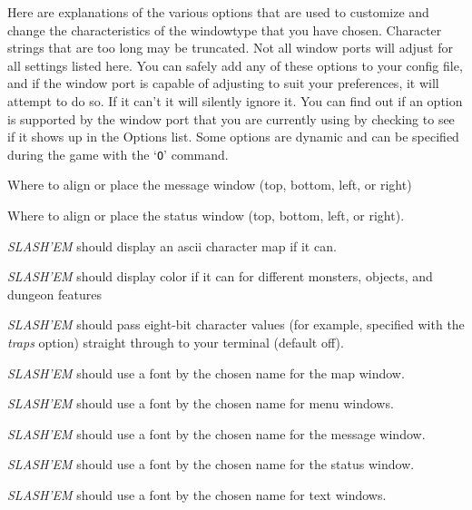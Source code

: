 
Here are explanations of the various options that are
used to customize and change the characteristics of the
windowtype that you have chosen.
Character strings that are too long may be truncated.
Not all window ports will adjust for all settings listed
here.  You can safely add any of these options to your config
file, and if the window port is capable of adjusting to
suit your preferences, it will attempt to do so. If it
can't it will silently ignore it.  You can find out if an
option is supported by the window port that you are currently
using by checking to see if it shows up in the Options list.
Some options are dynamic and can be specified during the game
with the `{\tt O}' command.
\blist{}

\item[\ib{align\_message}]
Where to align or place the message window (top, bottom, left, or right)

\item[\ib{align\_status}]
Where to align or place the status window (top, bottom, left, or right).

\item[\ib{ascii\_map}]
{\it SLASH'EM\/} should display an ascii character map if it can.

\item[\ib{color		}]
{\it SLASH'EM\/} should display color if it can for different monsters, 
objects, and dungeon features

\item[\ib{eight\_bit\_tty	}]
{\it SLASH'EM\/} should pass eight-bit character values (for example, specified with the
{\it traps\/} 
option) straight through to your terminal (default off).

\item[\ib{font\_map	}]
{\it SLASH'EM\/} should use a font by the chosen name for the map window.

\item[\ib{font\_menu	}]
{\it SLASH'EM\/} should use a font by the chosen name for menu windows.

\item[\ib{font\_message	}]
{\it SLASH'EM\/} should use a font by the chosen name for the message window.

\item[\ib{font\_status	}]
{\it SLASH'EM\/} should use a font by the chosen name for the status window.

\item[\ib{font\_text	}]
{\it SLASH'EM\/} should use a font by the chosen name for text windows.

